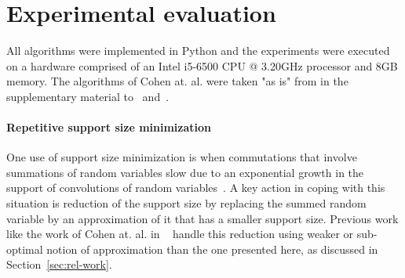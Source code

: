 \documentclass{article}
\newtheorem{theorem}[thm]{Theorem}
\DeclareMathOperator{\support}{support}
\DeclareMathOperator{\KlmApprox}{KolmogorovApprox}
\begin{document}
	
	
	
	
	
	
	
	\section{Experimental evaluation}\label{sec:exp}
	All algorithms were implemented in Python and the experiments were executed on a hardware comprised of an Intel i5-6500 CPU @ 3.20GHz processor and 8GB memory. The algorithms of Cohen at. al. were taken "as is" from in the supplementary material to~\cite{cohen2015estimating} and~\cite{CohenGW18}.
	
	\paragraph{Repetitive support size minimization} One use of support size minimization is when commutations that involve summations of random variables slow due to an exponential growth in the support of convolutions of random variables~\cite{cohen2015estimating}. A key action in coping with this situation is reduction of the  support size by replacing the summed random variable by an approximation of it that has a smaller support size. Previous work like the work of Cohen at. al. in ~\cite{cohen2015estimating,CohenGW18} handle this reduction using weaker or sub-optimal notion of approximation than the one presented here, as discussed in Section~\ref{sec:rel-work}. 
	
\end{document}
